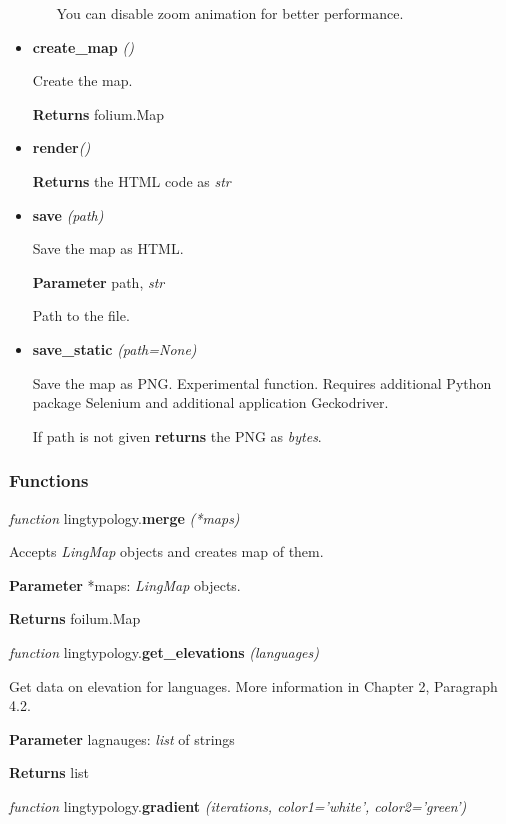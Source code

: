 \documentclass[a4paper,12pt]{article}
\begin{document}
\begin{itemize}
\begin{itemize}
  You can disable zoom animation for better performance.
 
 \end{itemize}
 
 \item \textbf{create\_map} \textit{()}
 
 Create the map.
 
 \textbf{Returns} folium.Map
 
 \item \textbf{render}\textit{()}
 
 \textbf{Returns} the HTML code as \textit{str}
 
 \item \textbf{save} \textit{(path)}
 
 Save the map as HTML.
 
 \textbf{Parameter} path, \textit{str}
 
 Path to the file.
 
 \item \textbf{save\_static} \textit{(path=None)}
 
 Save the map as PNG. Experimental function. Requires additional Python package Selenium and additional application Geckodriver.
 
 If path is not given \textbf{returns} the PNG as \textit{bytes}.

\end{itemize}

\subsubsection{Functions}

\textit{function} lingtypology.\textbf{merge} \textit{(*maps)}

Accepts \textit{LingMap} objects and creates map of them.

\textbf{Parameter} *maps: \textit{LingMap} objects.

\textbf{Returns} foilum.Map
\medskip

\textit{function} lingtypology.\textbf{get\_elevations} \textit{(languages)}

Get data on elevation for languages. More information in Chapter 2, Paragraph 4.2.

\textbf{Parameter} lagnauges: \textit{list} of strings

\textbf{Returns} list
\medskip

\textit{function} lingtypology.\textbf{gradient} \textit{(iterations, color1='white', color2='green')}
\end{document}
